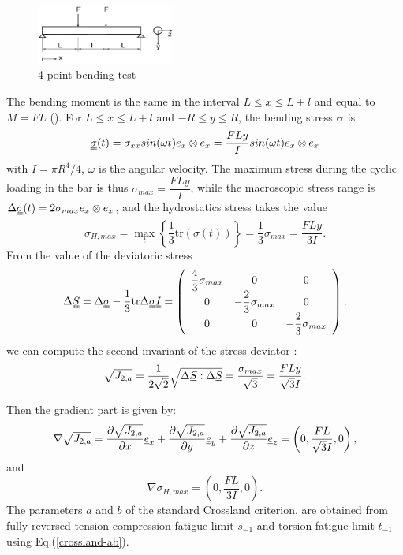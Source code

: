 \begin{figure}[h!]
	\centering
	\includegraphics[width=0.4\textwidth]{figures//fig11.jpg} 
	\caption{4-point bending test\cite{Papadopoulos1996513} }
	\label{fig11}
\end{figure}

The bending moment is the same in the interval $L\leqslant x \leqslant L+l$ and equal to
$M = FL$ ().
For $L\leqslant x \leqslant L+l$ and  $-R\leqslant y \leqslant R$, the bending stress $\bm{\sigma}$  is
\begin{equation}
	\uuline{\sigma}(t)=\sigma_{xx}sin(\omega t)e_x\otimes e_x=\dfrac{FLy}{I}sin(\omega t) e_x\otimes e_x \label{bending4} \end{equation}
with $I=\pi R^4/4$, $\omega$ is the angular velocity.  The maximum stress during the cyclic loading in the bar  is thus 
$ \sigma_{max}=\dfrac{FLy}{I}$, 
while the macroscopic stress range is $ \Delta\uuline{\sigma}(t)=2\sigma_{max}e_x\otimes e_x $, and the 
hydrostatics stress takes the value
\begin{equation}
	\sigma_{H,max}=\max\limits_{t}\left\lbrace \dfrac{1}{3}\textrm{tr}(\sigma(t))\right\rbrace =\dfrac{1}{3}\sigma_{max}=\dfrac{FLy}{3I}.
\end{equation}
From the value of  the deviatoric stress
\begin{equation} 
	\Delta\uuline{ S}=\Delta\uuline{\sigma}-\dfrac{1}{3}\textrm{tr}\Delta\uuline{\sigma}\uuline{I}=
	\left(
	\begin{array}{ccc}
		\dfrac{4}{3}\sigma_{max} & 0 & 0\\
		0 & -\dfrac{2}{3}\sigma_{max} & 0\\ 
		0 & 0 & -\dfrac{2}{3}\sigma_{max}\\
	\end{array}\right) ,
\end{equation}
we can compute the second invariant of the stress deviator :
\begin{equation}
	\sqrt{J_{2,a}}=\dfrac{1}{2\sqrt{2}}\sqrt{\Delta \uuline{S}:\Delta \uuline{S}}=\dfrac{\sigma_{max}}{\sqrt{3}} =\dfrac{FLy}{\sqrt{3}I} .
\end{equation}


Then the gradient part is given by:
\begin{equation}
	\nabla\sqrt{J_{2,a}}=\dfrac{\partial\sqrt{J_{2,a}}}{\partial x}\uline{e}_x+\dfrac{\partial\sqrt{J_{2,a}}}{\partial y}\uline{e}_y+\dfrac{\partial\sqrt{J_{2,a}}}{\partial z}\uline{e}_z=\left( 0,\dfrac{FL}{\sqrt{3}I},0\right)  ,
\end{equation}
and
\begin{equation}
	\nabla \sigma_{H,max}=(0,\dfrac{FL}{3I},0).
\end{equation}
The parameters $a$ and $b$ of the standard Crossland criterion, are obtained from fully reversed tension-compression fatigue limit $s_{-1}$  and torsion fatigue limit $t_{-1}$ using Eq.(\ref{crossland-ab}).

